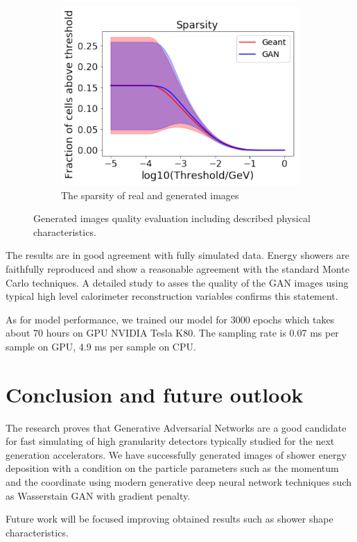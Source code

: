 \documentclass{webofc}
\begin{document}
\begin{figure}
\begin{subfigure}{0.19\textwidth}
    \includegraphics[width=1\textwidth]{figures/sparsity.pdf}
    \caption{The sparsity of real and generated images}
  \end{subfigure}
  \caption{Generated images quality evaluation including described physical characteristics.}\label{fig:quality}  
\end{figure}

The results are in good agreement with fully simulated data. Energy showers are faithfully reproduced and show a reasonable agreement with the standard Monte Carlo techniques. A detailed study to asses the quality of the GAN images using typical high level calorimeter reconstruction variables confirms this statement.

As for model performance, we trained our model for 3000 epochs which takes about 70 hours on GPU NVIDIA Tesla K80. The sampling rate is 0.07 ms per sample on GPU, 4.9 ms per sample on CPU.

\section{Conclusion and future outlook}\label{conclusion}
The research proves that Generative Adversarial Networks are a good candidate for fast simulating of high granularity detectors typically studied for the next generation accelerators. We have successfully generated images of shower energy deposition with a condition on the particle parameters such as the momentum and the coordinate using modern generative deep neural network techniques such as Wasserstain GAN with gradient penalty.

Future work will be focused improving obtained results such as shower shape characteristics.




\appendix
\end{document}
